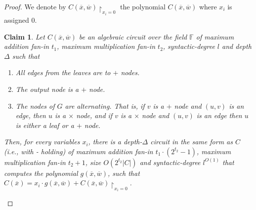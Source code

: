 \documentclass[11pt,letter]{article}
\newtheorem{claim}[theorem]{Claim}
\theoremstyle{remark} %
\begin{document}
{\begin{proof}
        We denote by $C(\overline{x},\overline{w}) \restriction _{x_i = 0}$ the polynomial $C(\overline{x},\overline{w})$ where $x_i$ is assigned $0$.\par
        \bigskip
        \begin{claim}\label{claim:01} Let $C(\overline{x},\overline{w})$ be an algebraic circuit over the field $\mathbb{F}$ of maximum addition fan-in $t_1$, maximum multiplication fan-in $t_2$, syntactic-degree $l$ and depth $\Delta$ such that 
        \begin{enumerate}
            \item All edges from the leaves are to $+$ nodes.\label{it:2127:1}
            \item The output node is a $+$ node. \label{it:2127:2}
            \item The nodes of $G$ are alternating. That is, if $v$ is a $+$ node and $(u,v)$ is an edge, then $u$ is a $\times$ node, and if $v$ is a $\times$ node and $(u,v)$ is an edge then $u$ is either a leaf or a $+$ node.\label{it:2127:3}
        \end{enumerate}
        Then, for every variables $x_i$, there is a depth-$\Delta$ circuit in the same form as $C$ (i.e., with - holding) of maximum addition fan-in $t_1\cdot(2^{t_2}-1)$, maximum multiplication fan-in $t_2+1$, size $O(2^{t_2}|C|)$ and syntactic-degree $l^{O(1)}$ that computes the polynomial $g(\overline{x},\overline{w})$, such that $C(\overline{x}) = x_i \cdot g(\overline{x},\overline{w}) + C(\overline{x},\overline{w}) \restriction_{x_i = 0}$.
        \end{claim}


\end{proof}}
\end{document}

